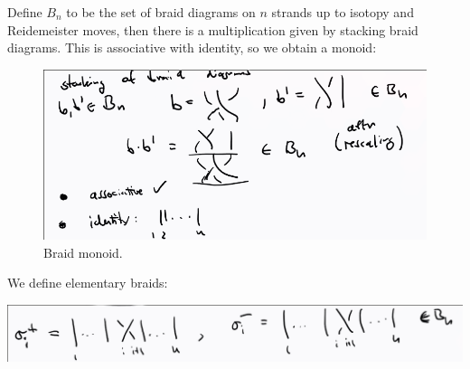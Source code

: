\begin{definition}

Define \(B_n\) to be the set of braid diagrams on \(n\) strands up to
isotopy and Reidemeister moves, then there is a multiplication given by
stacking braid diagrams. This is associative with identity, so we obtain
a monoid:

\begin{figure}
\centering
\includegraphics[width=6.77083in,height=\textheight]{figures/image_2020-07-08-11-45-36.png}
\caption{Braid monoid.}
\end{figure}

\end{definition}

\begin{definition}

We define elementary braids:

\includegraphics{figures/image_2020-07-08-11-46-13.png}

\end{definition}

